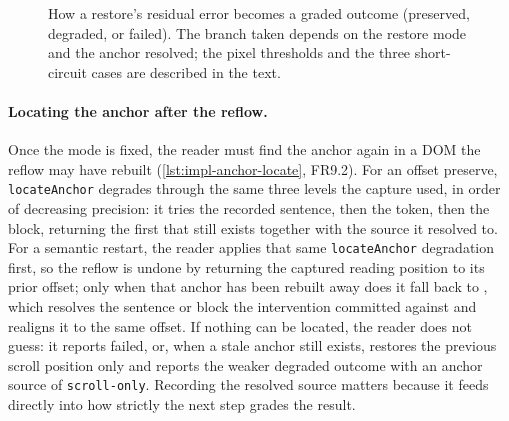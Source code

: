 \begin{figure}[htbp]
{%
}
\caption[How a restore's residual error becomes a graded outcome.]{How a restore's residual error becomes a graded outcome (preserved, degraded, or failed). The branch taken depends on the restore mode and the anchor resolved; the pixel thresholds and the three short-circuit cases are described in the text.}
\label{fig:impl-context-decision}
\end{figure}

\paragraph{Locating the anchor after the reflow.}
Once the mode is fixed, the reader must find the anchor again in a DOM the reflow may have rebuilt (\cref{lst:impl-anchor-locate}, FR9.2).
For an offset preserve, \texttt{locateAnchor} degrades through the same three levels the capture used, in order of decreasing precision: it tries the recorded sentence, then the token, then the block, returning the first that still exists together with the source it resolved to.
For a semantic restart, the reader applies that same \texttt{locateAnchor} degradation first, so the reflow is undone by returning the captured reading position to its prior offset; only when that anchor has been rebuilt away does it fall back to , which resolves the sentence or block the intervention committed against and realigns it to the same offset.
If nothing can be located, the reader does not guess: it reports failed, or, when a stale anchor still exists, restores the previous scroll position only and reports the weaker degraded outcome with an anchor source of \texttt{scroll-only}.
Recording the resolved source matters because it feeds directly into how strictly the next step grades the result.

